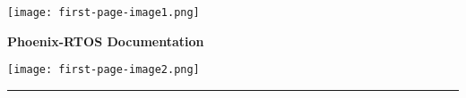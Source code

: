 %
%
%
%

\newcommand{\doctitle}{Phoenix-RTOS Documentation}
\newcommand{\docauthor}{}
\newcommand{\docversion}{} %
\newcommand{\docdate}{}  %

\clearpage
\thispagestyle{empty}

\texttt{[image: first-page-image1.png]}

\vspace{2.0cm}

{\setmainfont{Liberation Sans}
\textcolor{ps-darkblue}{%
    {\fontsize{30}{36}\selectfont \textbf{\doctitle}\\}
}}
\vskip 0.2cm
{\setmainfont{Liberation Sans}
\textcolor{ps-darkblue}{%
    {\fontsize{16}{19}\selectfont \textbf{\docauthor}}
}}
\vspace{2.25cm}

\begin{flushright}
    \texttt{[image: first-page-image2.png]}
\end{flushright}

\vspace{\fill}

\begin{center}
    \color{ps-orange}\rule{\textwidth}{2pt}
\end{center}

\vspace{0.15cm}
{\setmainfont{Liberation Sans}
\fontsize{10}{12}\selectfont
\textcolor{ps-lightblue}{%
    \makebox[\textwidth][l]{\hspace{0.2cm}\docversion\hfill \docdate\hspace{0.2cm}}
}}
\clearpage
\pagestyle{plain}
